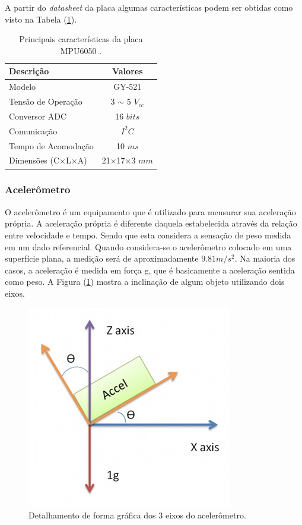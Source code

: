 A partir do \textit{datasheet} da placa algumas características podem ser obtidas como visto na Tabela (\ref{tab:ParametrosPlacaMPU6050}).
\begin{table}[!htb]
\centering
\caption{Principais características da placa MPU6050 \citep{MPU6050}.}
\label{tab:ParametrosPlacaMPU6050}
\begin{tabular}{@{}lc@{}}
    \toprule
    \textbf{Descrição}              & \textbf{Valores}             \\ 
    \midrule
    Modelo                          & GY-521                        \\
    Tensão de Operação              & 3 $\sim$ 5 $V_{cc}$           \\
    Conversor ADC                   & 16 $bits$                     \\
    Comunicação                     & $I^2C$                        \\ 
    Tempo de Acomodação             & 10 $ms$                       \\
    Dimensões (C$\times$L$\times$A) & 21$\times$17$\times$3 $mm$    \\ 
    \bottomrule
\end{tabular}
\end{table}

\subsubsection{Acelerômetro}
O acelerômetro é um equipamento que é utilizado para mensurar sua aceleração própria. A aceleração própria é diferente daquela estabelecida através da relação entre velocidade e tempo. Sendo que esta considera a sensação de peso medida em um dado referencial. Quando considera-se o acelerômetro colocado em uma superfície plana, a medição será de aproximadamente $9.81 m/s^2$. Na maioria dos casos, a aceleração é medida em força g, que é basicamente a aceleração sentida como peso. A Figura (\ref{fig:InclinacaoAcelMPU}) mostra a inclinação de algum objeto utilizando dois eixos. 
\begin{figure}[H]
    \centering
    \includegraphics[scale=0.7]{Metodologia/Acelerometro}
    \caption{Detalhamento de forma gráfica dos 3 eixos do acelerômetro.}
    \label{fig:InclinacaoAcelMPU}
\end{figure}

